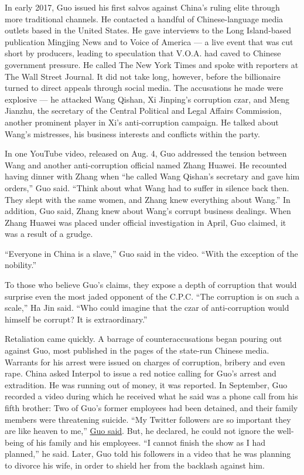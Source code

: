 In early 2017, Guo issued his first salvos against China's ruling elite
through more traditional channels. He contacted a handful of
Chinese-language media outlets based in the United States. He gave
interviews to the Long Island-based publication Mingjing News and to
Voice of America --- a live event that was cut short by producers,
leading to speculation that V.O.A. had caved to Chinese government
pressure. He called The New York Times and spoke with reporters at The
Wall Street Journal. It did not take long, however, before the
billionaire turned to direct appeals through social media. The
accusations he made were explosive --- he attacked Wang Qishan, Xi
Jinping's corruption czar, and Meng Jianzhu, the secretary of the
Central Political and Legal Affairs Commission, another prominent player
in Xi's anti-corruption campaign. He talked about Wang's mistresses, his
business interests and conflicts within the party.

In one YouTube video, released on Aug. 4, Guo addressed the tension
between Wang and another anti-corruption official named Zhang Huawei. He
recounted having dinner with Zhang when ``he called Wang Qishan's
secretary and gave him orders,'' Guo said. ``Think about what Wang had
to suffer in silence back then. They slept with the same women, and
Zhang knew everything about Wang.'' In addition, Guo said, Zhang knew
about Wang's corrupt business dealings. When Zhang Huawei was placed
under official investigation in April, Guo claimed, it was a result of a
grudge.

``Everyone in China is a slave,'' Guo said in the video. ``With the
exception of the nobility.''

To those who believe Guo's claims, they expose a depth of corruption
that would surprise even the most jaded opponent of the C.P.C. ``The
corruption is on such a scale,'' Ha Jin said. ``Who could imagine that
the czar of anti-corruption would himself be corrupt? It is
extraordinary.''

Retaliation came quickly. A barrage of counteraccusations began pouring
out against Guo, most published in the pages of the state-run Chinese
media. Warrants for his arrest were issued on charges of corruption,
bribery and even rape. China asked Interpol to issue a red notice
calling for Guo's arrest and extradition. He was running out of money,
it was reported. In September, Guo recorded a video during which he
received what he said was a phone call from his fifth brother: Two of
Guo's former employees had been detained, and their family members were
threatening suicide. ``My Twitter followers are so important they are
like heaven to me,''
\href{https://www.youtube.com/watch?v=aGjBsAB46fI\&t=887s}{Guo said}.
But, he declared, he could not ignore the well-being of his family and
his employees. ``I cannot finish the show as I had planned,'' he said.
Later, Guo told his followers in a video that he was planning to divorce
his wife, in order to shield her from the backlash against him.

